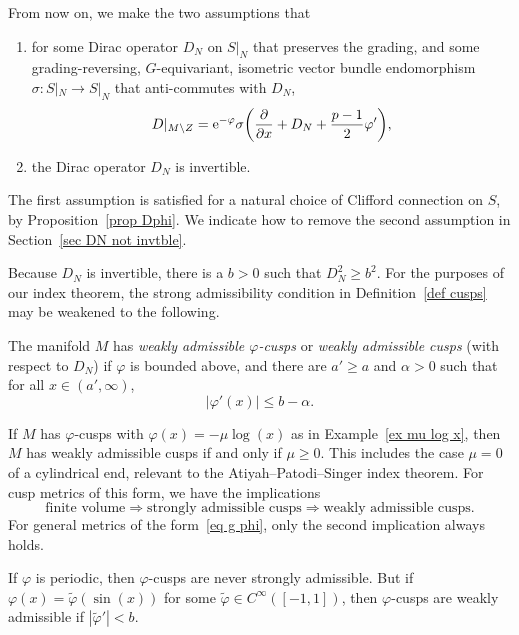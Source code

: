 \documentclass[10pt,a4paper]{amsart}
\numberwithin{equation}{section}
\begin{document}
From now on, we make the two assumptions that
\begin{enumerate}\itemsep=0pt
\item[(1)] for some Dirac operator $D_N$ on $S|_N$ that preserves the grading, and some grading-reversing, $G$-equivariant, isometric vector bundle endomorphism $\sigma\colon S|_N \to S|_N$ that anti-commutes with $D_N$,
\begin{equation} \label{eq DC Dphi}
 D|_{M \setminus Z} = {\rm e}^{-\varphi} \sigma \bigg(\frac{\partial}{\partial x}+D_N +\frac{p-1}{2}\varphi' \bigg),
 \end{equation}
 \item[(2)] the Dirac operator $D_N$ is invertible.
\end{enumerate}
The first assumption is satisfied for a natural choice of Clifford connection on $S$, by Proposition~\ref{prop Dphi}. We indicate how to remove the second assumption in Section~\ref{sec DN not invtble}.

Because $D_N$ is invertible, there is a $b>0$ such that $D_N^2 \geq b^2$. For the purposes of our index theorem, the strong admissibility condition in Definition~\ref{def cusps} may be weakened to the following.
\begin{Definition}\label{def weakly adm}
The manifold $M$ has \emph{weakly admissible $\varphi$-cusps} or \emph{weakly admissible cusps} (with respect to $D_N$) if $\varphi$ is bounded above, and there are $a'\geq a$ and $\alpha>0$ such that for all $x \in (a', \infty)$,
\begin{equation} \label{eq bound phi' b}
|\varphi'(x)| \leq b - \alpha.
\end{equation}
\end{Definition}
\begin{Example}
If $M$ has $\varphi$-cusps with $\varphi(x) = -\mu\log(x)$ as in Example~\ref{ex mu log x}, then $M$ has weakly admissible cusps if and only if $\mu \geq 0$. This includes the case $\mu=0$ of a cylindrical end, relevant to the Atiyah--Patodi--Singer index theorem. For cusp metrics of this form, we have the implications
\[
\text{finite volume} \Rightarrow \text{strongly admissible cusps} \Rightarrow \text{weakly admissible cusps}.
\]
For general metrics of the form~\eqref{eq g phi}, only the second implication always holds.
\end{Example}

\begin{Example}
If $\varphi$ is periodic, then $\varphi$-cusps are never strongly admissible. But if $\varphi(x) = \tilde \varphi(\sin(x))$ for some $\tilde \varphi \in C^{\infty}([-1,1])$, then $\varphi$-cusps are weakly admissible if $|\tilde \varphi'| < b$.
\end{Example}
\end{document}
